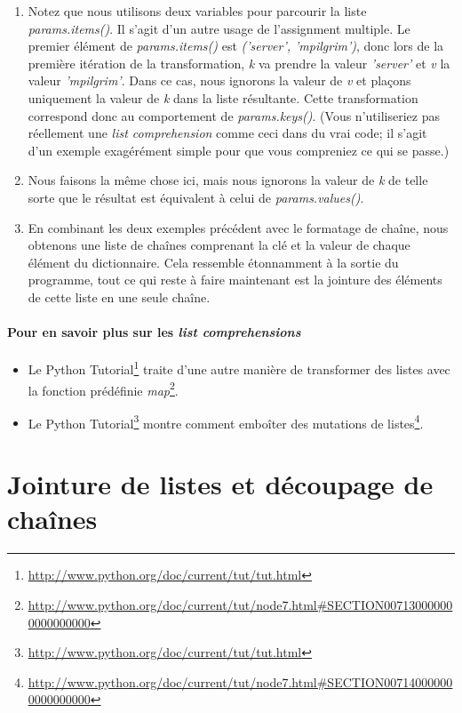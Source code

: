 \begin{enumerate}
\item Notez que nous utilisons deux variables pour parcourir la liste
    \emph{params.items()}. Il s'agit d'un autre usage de l'assignment multiple. Le
    premier élément de \emph{params.items()} est \emph{('server', 'mpilgrim')}, donc lors de
    la première itération de la transformation, \emph{k} va prendre la valeur \emph{'server'}
    et \emph{v} la valeur \emph{'mpilgrim'}. Dans ce cas, nous ignorons la valeur de \emph{v} et
    plaçons uniquement la valeur de \emph{k} dans la liste résultante. Cette
    transformation correspond donc au comportement de \emph{params.keys()}. (Vous
    n'utiliseriez pas réellement une \emph{list comprehension} comme ceci dans du vrai
    code; il s'agit d'un exemple exagérément simple pour que vous compreniez ce
    qui se passe.)
\item Nous faisons la même chose ici, mais nous ignorons la valeur de \emph{k} de telle
    sorte que le résultat est équivalent à celui de \emph{params.values()}.
\item En combinant les deux exemples précédent avec le formatage de chaîne, nous
    obtenons une liste de chaînes comprenant la clé et la valeur de chaque
    élément du dictionnaire. Cela ressemble étonnamment à la sortie du
    programme, tout ce qui reste à faire maintenant est la jointure des
    éléments de cette liste en une seule chaîne.
\end{enumerate}

\paragraph{Pour en savoir plus sur les \emph{list comprehensions}}
\begin{itemize}
\item Le Python Tutorial\footnote{\url{http://www.python.org/doc/current/tut/tut.html}} traite d'une autre manière de transformer des listes avec la fonction prédéfinie \emph{map}\footnote{\url{http://www.python.org/doc/current/tut/node7.html\#SECTION007130000000000000000}}.
\item Le Python Tutorial\footnote{\url{http://www.python.org/doc/current/tut/tut.html}} montre comment emboîter des mutations de listes\footnote{\url{http://www.python.org/doc/current/tut/node7.html\#SECTION007140000000000000000}}.
\end{itemize}

\section{Jointure de listes et découpage de chaînes}

